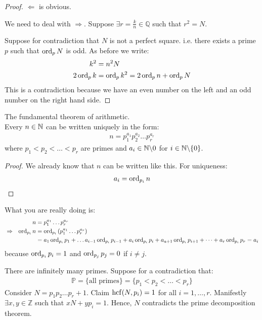 \begin{proof}
$\Leftarrow$ is obvious.

We need to deal with $\Rightarrow$. Suppose $\exists r = \frac k n \in \mathbb Q$ such that $r^2 = N$.

Suppose for contradiction that $N$ is not a perfect square. i.e. there exists a prime $p$ such that $\operatorname{ord}_p N$ is odd. As before we write:
\begin{align*}
k^2 & = n^2 N \\
2 \operatorname{ord}_p k & = \operatorname{ord}_p k^2 = 2 \operatorname{ord}_p n + \operatorname{ord}_p N
\end{align*}
This is a contradiction because we have an even number on the left and an odd number on the right hand side.
\end{proof}


\begin{tm}
The fundamental theorem of arithmetic. \\
Every $n \in \mathbb N$ can be written uniquely in the form:
\begin{align*}
n = p_1^{a_1}  p_2^{a_2}  \dots  p_r^{a_r}
\end{align*}
where $p_1 < p_2< \dots < p_r$ are primes and $a_i \in \mathbb N \backslash {0}$ for $i\in \mathbb N \backslash\{ 0 \}$.
\end{tm}
\begin{proof}
We already know that $n$ can be written like this. For uniqueness:
\begin{align*}
a_i = \operatorname{ord}_{p_i} n
\end{align*}
\end{proof}

\begin{rk}
What you are really doing is:
\begin{align*}
& & n & = p_1^{a_1} \dots p_r^{a_r} \\
& \Rightarrow & \operatorname{ord}_{p_i} n & = \operatorname{ord}_{p_i} \left( p_1^{a_1} \dots p_r^{a_r} \right) \\
& & & = a_1 \operatorname{ord}_{p_i} p_1 + \dots a_{i-1} \operatorname{ord}_{p_i} p_{i-1}
+ a_i \operatorname{ord}_{p_i} p_i
+ a_{a+1} \operatorname{ord}_{p_i} p_{i+1}
+ \dots + a_r \operatorname{ord}_{p_i} p_r
= a_i 
\end{align*}
because $\operatorname{ord}_{p_i} p_i =1$ and $\operatorname{ord}_{p_j} p_j = 0$ if $i \neq j$.
\end{rk}

\begin{ex}
There are infinitely many primes. 
Suppose for a contradiction that:
\begin{align*}
\mathbb P = \{ \text{all primes} \} = \{ p_1< p_2< \dots < p_r \}
\end{align*}
Consider $N = p_1p_2 \dots p_r +1$. Claim $\operatorname{hcf}(N, p_i) =1$ for all $i= 1, \dots, r$.
Manifestly $\exists x,y \in \mathbb Z$ such that $x N + yp_i = 1$. Hence, $N$ contradicts the prime decomposition theorem.
\end{ex}

